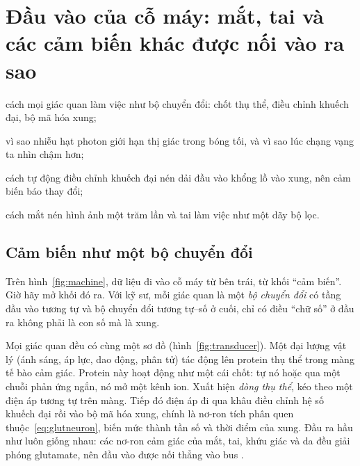 \chapter{Đầu vào của cỗ máy: mắt, tai và các cảm biến khác được nối vào ra sao}
\label{sec:sensors}
\begin{chaptergoals}
\item cách mọi giác quan làm việc như bộ chuyển đổi: chốt thụ thể, điều chỉnh khuếch đại, bộ mã hóa xung;
\item vì sao nhiễu hạt photon giới hạn thị giác trong bóng tối, và vì sao lúc chạng vạng ta nhìn chậm hơn;
\item cách tự động điều chỉnh khuếch đại nén dải đầu vào khổng lồ vào xung, nên cảm biến báo thay đổi;
\item cách mắt nén hình ảnh một trăm lần và tai làm việc như một dãy bộ lọc.
\end{chaptergoals}

\section{Cảm biến như một bộ chuyển đổi}

Trên hình~\ref{fig:machine}, dữ liệu đi vào cỗ máy từ bên trái, từ khối ``cảm biến''. Giờ hãy mở khối đó ra. Với kỹ sư, mỗi giác quan là một \emph{bộ chuyển đổi} có tầng đầu vào tương tự và bộ chuyển đổi tương tự--số ở cuối, chỉ có điều ``chữ số'' ở đầu ra không phải là con số mà là xung.

Mọi giác quan đều có cùng một sơ đồ (hình~\ref{fig:transducer}). Một đại lượng vật lý (ánh sáng, áp lực, dao động, phân tử) tác động lên protein thụ thể trong màng tế bào cảm giác. Protein này hoạt động như một cái chốt: tự nó hoặc qua một chuỗi phản ứng ngắn, nó mở một kênh ion. Xuất hiện \emph{dòng thụ thể}, kéo theo một điện áp tương tự trên màng. Tiếp đó điện áp đi qua khâu điều chỉnh hệ số khuếch đại rồi vào bộ mã hóa xung, chính là nơ-ron tích phân quen thuộc~\eqref{eq:glutneuron}, biến mức thành tần số và thời điểm của xung. Đầu ra hầu như luôn giống nhau: các nơ-ron cảm giác của mắt, tai, khứu giác và da đều giải phóng glutamate, nên đầu vào được nối thẳng vào bus .

